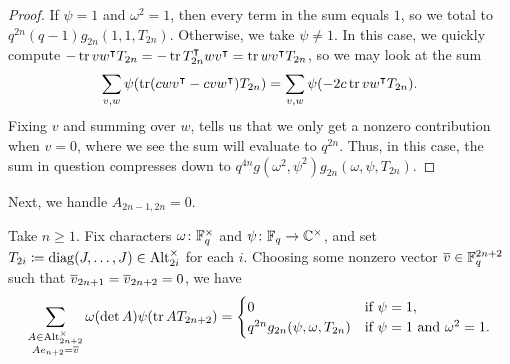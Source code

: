 \begin{proof}
    If $\psi=1$ and $\omega^2=1$, then every term in the sum equals $1$, so we total to $q^{2n}(q-1)g_{2n}(1,1,T_{2n})$. Otherwise, we take $\psi\ne1$. In this case, we quickly compute $-\operatorname{tr} vw^\intercal T_{2n}=-\operatorname{tr} T_{2n}^\intercal wv^\intercal=\operatorname{tr} wv^\intercal T_{2n}$, so we may look at the sum
    \[\sum_{v,w}\psi(\operatorname{tr}(cwv^\intercal-cvw^\intercal)T_{2n})=\sum_{v,w}\psi(-2c\operatorname{tr} vw^\intercal T_{2n}).\]
    Fixing $v$ and summing over $w$,  tells us that we only get a nonzero contribution when $v=0$, where we see the sum will evaluate to $q^{2n}$. Thus, in this case, the sum in question compresses down to $q^{4n}g\left(\omega^2,\psi^2\right)g_{2n}(\omega,\psi,T_{2n})$.
\end{proof}
Next, we handle $A_{2n-1,2n}=0$.
\begin{lemma} \label{lem:gsum-alt-0}
    Take $n\ge1$. Fix characters $\omega\colon\mathbb F_q^\times$ and $\psi\colon\mathbb F_q\to\mathbb C^\times$, and set $T_{2i}\coloneqq\operatorname{diag}(J,\ldots,J)\in\operatorname{Alt}^\times_{2i}$ for each $i$. Choosing some nonzero vector $\overline{v}\in\mathbb F_q^{2n+2}$ such that $\overline{v}_{2n+1}=\overline{v}_{2n+2}=0$, we have
    \[\sum_{\substack{A\in\operatorname{Alt}_{2n+2}^\times\\Ae_{n+2}=\overline{v}}}\omega(\det A)\psi(\operatorname{tr} AT_{2n+2})=\begin{cases}
        0 & \text{if }\psi=1, \\
        q^{2n}g_{2n}(\psi,\omega,T_{2n}) & \text{if }\psi=1\text{ and }\omega^2=1.
    \end{cases}\]
\end{lemma}
